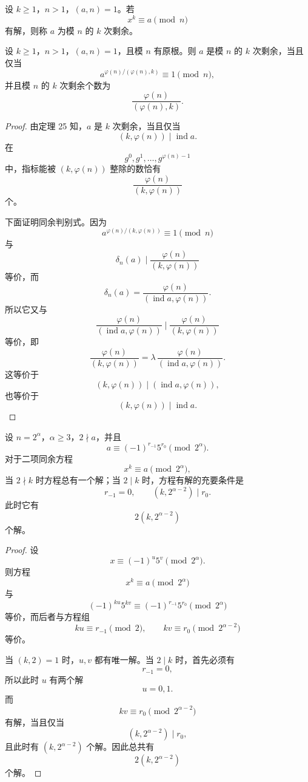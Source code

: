 \begin{definition}[原文 定义 6]
	设 $k\geq 1$，$n>1$，$(a,n)=1$。若
	\[
		x^k\equiv a\pmod n
	\]
	有解，则称 $a$ 为模 $n$ 的 $k$ 次剩余。
\end{definition}

\begin{theorem}[原文 定理 26]
	设 $k\geq 1$，$n>1$，$(a,n)=1$，且模 $n$ 有原根。则 $a$ 是模 $n$ 的 $k$ 次剩余，当且仅当
	\[
		a^{\varphi(n)/(\varphi(n),k)}\equiv 1\pmod n,
	\]
	并且模 $n$ 的 $k$ 次剩余个数为
	\[
		\frac{\varphi(n)}{(\varphi(n),k)}.
	\]
\end{theorem}

\begin{proof}
	由定理 25 知，$a$ 是 $k$ 次剩余，当且仅当
	\[
		(k,\varphi(n))\mid \operatorname{ind}a.
	\]
	在
	\[
		g^0,g^1,\ldots,g^{\varphi(n)-1}
	\]
	中，指标能被 $(k,\varphi(n))$ 整除的数恰有
	\[
		\frac{\varphi(n)}{(k,\varphi(n))}
	\]
	个。

	下面证明同余判别式。因为
	\[
		a^{\varphi(n)/(k,\varphi(n))}\equiv 1\pmod n
	\]
	与
	\[
		\delta_n(a)\mid \frac{\varphi(n)}{(k,\varphi(n))}
	\]
	等价，而
	\[
		\delta_n(a)=\frac{\varphi(n)}{(\operatorname{ind}a,\varphi(n))}.
	\]
	所以它又与
	\[
		\frac{\varphi(n)}{(\operatorname{ind}a,\varphi(n))}
		\mid
		\frac{\varphi(n)}{(k,\varphi(n))}
	\]
	等价，即
	\[
		\frac{\varphi(n)}{(k,\varphi(n))}
		=
		\lambda\,
		\frac{\varphi(n)}{(\operatorname{ind}a,\varphi(n))}.
	\]
	这等价于
	\[
		(k,\varphi(n))\mid(\operatorname{ind}a,\varphi(n)),
	\]
	也等价于
	\[
		(k,\varphi(n))\mid \operatorname{ind}a.
	\]
\end{proof}

\begin{theorem}[原文 定理 27]
	设 $n=2^\alpha$，$\alpha\geq 3$，$2\nmid a$，并且
	\[
		a\equiv (-1)^{r_{-1}}5^{r_0}\pmod {2^\alpha}.
	\]
	对于二项同余方程
	\[
		x^k\equiv a\pmod {2^\alpha},
	\]
	当 $2\nmid k$ 时方程总有一个解；当 $2\mid k$ 时，方程有解的充要条件是
	\[
		r_{-1}=0,\qquad (k,2^{\alpha-2})\mid r_0.
	\]
	此时它有
	\[
		2(k,2^{\alpha-2})
	\]
	个解。
\end{theorem}

\begin{proof}
	设
	\[
		x\equiv (-1)^u5^v\pmod {2^\alpha}.
	\]
	则方程
	\[
		x^k\equiv a\pmod {2^\alpha}
	\]
	与
	\[
		(-1)^{ku}5^{kv}\equiv (-1)^{r_{-1}}5^{r_0}\pmod {2^\alpha}
	\]
	等价，而后者与方程组
	\[
		ku\equiv r_{-1}\pmod 2,\qquad
		kv\equiv r_0\pmod {2^{\alpha-2}}
	\]
	等价。

	当 $(k,2)=1$ 时，$u,v$ 都有唯一解。当 $2\mid k$ 时，首先必须有
	\[
		r_{-1}=0,
	\]
	所以此时 $u$ 有两个解
	\[
		u=0,1.
	\]
	而
	\[
		kv\equiv r_0\pmod {2^{\alpha-2}}
	\]
	有解，当且仅当
	\[
		(k,2^{\alpha-2})\mid r_0,
	\]
	且此时有 $(k,2^{\alpha-2})$ 个解。因此总共有
	\[
		2(k,2^{\alpha-2})
	\]
	个解。
\end{proof}

